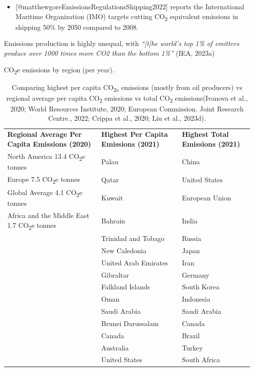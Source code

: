 \documentclass[
  letterpaper,
  DIV=11,
  numbers=noendperiod]{scrartcl}
\providecommand{\tightlist}{%
  \setlength{\itemsep}{0pt}\setlength{\parskip}{0pt}}\usepackage{longtable,booktabs,array}
\begin{document}
\begin{itemize}
\tightlist
\item
  {[}@matthewgoreEmissionsRegulationsShipping2022{]} reports the
  International Maritime Organization (IMO) targets cutting
  CO\textsubscript{2} equivalent emissions in shipping 50\% by 2050
  compared to 2008.
\end{itemize}

Emissions production is highly unequal, with \emph{``{[}t{]}he world's
top 1\% of emitters produce over 1000 times more CO2 than the bottom
1\%''} (IEA, 2023a)

CO\textsubscript{2}e emissions by region (per year).

\begin{longtable}[]{@{}
  >{\raggedright\arraybackslash}p{}
  >{\raggedright\arraybackslash}p{}
  >{\raggedright\arraybackslash}p{}@{}}
\caption{Comparing highest per capita CO\textsubscript{2e} emissions
(mostly from oil producers) vs regional average per capita
CO\textsubscript{2} emissions vs total CO\textsubscript{2}
emissions(Ivanova et al., 2020; World Resources Institute, 2020;
European Commission. Joint Research Centre., 2022; Crippa et al., 2020;
Liu et al., 2023d).}\tabularnewline
\toprule\noalign{}
\endfirsthead
\endhead
\bottomrule\noalign{}
\endlastfoot
\textbf{Regional Average Per Capita Emissions (2020)} & \textbf{Highest
Per Capita Emissions (2021)} & \textbf{Highest Total Emissions
(2021)} \\
North America 13.4 CO\textsubscript{2}e tonnes & Palau & China \\
Europe 7.5 CO\textsubscript{2}e tonnes & Qatar & United States \\
Global Average 4.1 CO\textsubscript{2}e tonnes & Kuwait & European
Union \\
Africa and the Middle East 1.7 CO\textsubscript{2}e tonnes & Bahrain &
India \\
& Trinidad and Tobago & Russia \\
& New Caledonia & Japan \\
& United Arab Emirates & Iran \\
& Gibraltar & Germany \\
& Falkland Islands & South Korea \\
& Oman & Indonesia \\
& Saudi Arabia & Saudi Arabia \\
& Brunei Darussalam & Canada \\
& Canada & Brazil \\
& Australia & Turkey \\
& United States & South Africa \\
\end{longtable}
\end{document}

